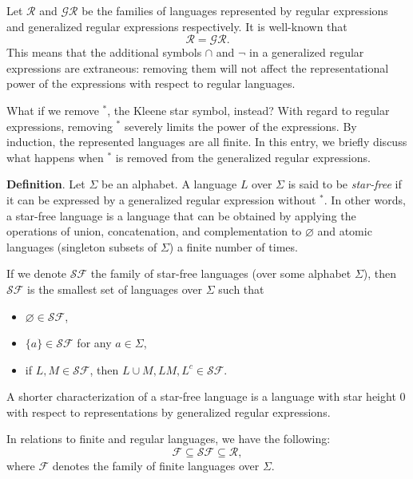 \documentclass[12pt]{article}
\begin{document}
Let $\mathscr{R}$ and $\mathscr{GR}$ be the families of languages represented by regular expressions and generalized regular expressions respectively.  It is well-known that $$\mathscr{R}=\mathscr{GR}.$$
This means that the additional symbols $\cap$ and $\neg$ in a generalized regular expressions are extraneous: removing them will not affect the representational power of the expressions with respect to regular languages.

What if we remove $^*$, the Kleene star symbol, instead?  With regard to regular expressions, removing $^*$ severely limits the power of the expressions.  By induction, the represented languages are all finite.  In this entry, we briefly discuss what happens when $^*$ is removed from the generalized regular expressions.

\textbf{Definition}.  Let $\Sigma$ be an alphabet.  A language $L$ over $\Sigma$ is said to be \emph{star-free} if it can be expressed by a generalized regular expression without $^*$.  In other words, a star-free language is a language that can be obtained by applying the operations of union, concatenation, and complementation to $\varnothing$ and atomic languages (singleton subsets of $\Sigma$) a finite number of times.

If we denote $\mathscr{SF}$ the family of star-free languages (over some alphabet $\Sigma$), then $\mathscr{SF}$ is the smallest set of languages over $\Sigma$ such that
\begin{itemize}
\item $\varnothing\in \mathscr{SF}$, 
\item $\lbrace a\rbrace \in \mathscr{SF}$ for any $a\in \Sigma$,
\item if $L,M \in \mathscr{SF}$, then $L\cup M, LM, L^c \in \mathscr{SF}$.
\end{itemize}

A shorter characterization of a star-free language is a language with star height $0$ with respect to representations by generalized regular expressions.

In relations to finite and regular languages, we have the following:
\begin{equation}
\mathscr{F}\subseteq \mathscr{SF} \subseteq \mathscr{R},
\end{equation}
where $\mathscr{F}$ denotes the family of finite languages over $\Sigma$.
\end{document}
